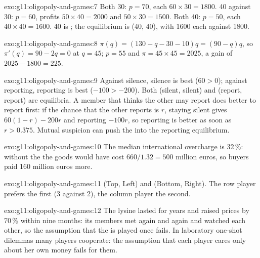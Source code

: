 \begin{solution}{exo:g11:oligopoly-and-games:7}
Both 30: $p = 70$, each $60 \times 30 = 1800$. 40 against 30: $p = 60$, profits $50 \times 40 = 2000$ and $50 \times 30 = 1500$. Both 40: $p = 50$, each $40 \times 40 = 1600$. 40 is
; the equilibrium is (40, 40), with 1600 each against 1800.
\end{solution}

\begin{solution}{exo:g11:oligopoly-and-games:8}
$\pi(q) = (130 - q - 30 - 10)q = (90 - q)q$, so $\pi'(q) = 90 - 2q = 0$ at $q = 45$; $p = 55$ and $\pi = 45 \times 45 = 2025$, a gain of $2025 - 1800 = 225$.
\end{solution}

\begin{solution}{exo:g11:oligopoly-and-games:9}
Against silence, silence is best ($60 > 0$); against reporting, reporting is best ($-100 > -200$). Both (silent, silent) and (report, report) are equilibria. A member that
thinks the other may report does better to report first: if the chance that the other reports is $r$, staying silent gives $60(1 - r) - 200r$ and reporting $-100r$, so
reporting is better as soon as $r > 0.375$. Mutual suspicion can push the  into the reporting equilibrium.
\end{solution}

\begin{solution}{exo:g11:oligopoly-and-games:10}
The median international overcharge is 32\,\%: without the  the goods would have cost $660/1.32 = 500$ million euros, so buyers paid 160 million euros more.
\end{solution}

\begin{solution}{exo:g11:oligopoly-and-games:11}
(Top, Left) and (Bottom, Right). The row player prefers the first (3 against 2), the column player the second.
\end{solution}

\begin{solution}{exo:g11:oligopoly-and-games:12}
The lysine  lasted for years and raised prices by 70\,\% within nine months: its members met again and again and watched each other, so the assumption that the 
is played once fails. In laboratory one-shot dilemmas many players cooperate: the assumption that each player cares only about her own money  fails for them.
\end{solution}

